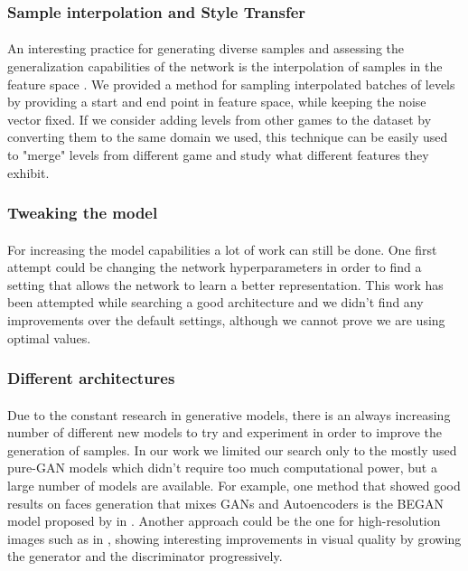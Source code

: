  \subsubsection{Sample interpolation and Style Transfer}
\paragraph{} An interesting practice for generating diverse samples and assessing the generalization capabilities of the network is the interpolation of samples in the feature space \cite{slerp}. We provided a method for sampling interpolated batches of levels by providing a start and end point in feature space, while keeping the noise vector fixed. If we consider adding levels from other games to the dataset by converting them to the same domain we used, this technique can be easily used to "merge" levels from different game and study what different features they exhibit.

\subsubsection{Tweaking the model}
\paragraph{} For increasing the model capabilities a lot of work can still be done. One first attempt could be changing the network hyperparameters in order to find a setting that allows the network to learn a better representation. This work has been attempted while searching a good architecture and we didn't find any improvements over the default settings, although we cannot prove we are using optimal values.

\subsubsection{Different architectures}
\paragraph{} Due to the constant research in generative models, there is an always increasing number of different new models to try and experiment in order to improve the generation of samples. In our work we limited our search only to the mostly used pure-GAN models which didn't require too much computational power, but a large number of models are available.
For example, one method that showed good results on faces generation that mixes GANs and Autoencoders is the BEGAN model proposed by \citeauthor{gan:BEGAN} in \cite{gan:BEGAN}. Another approach could be the one for high-resolution images such as in \textit{} \cite{gan:high-res}, showing interesting improvements in visual quality by growing the generator and the discriminator progressively.

